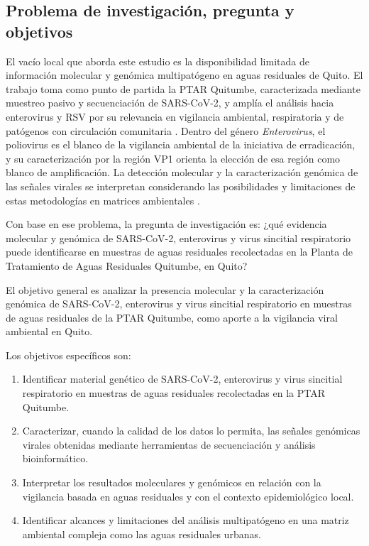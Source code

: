 \subsection{Problema de investigación, pregunta y objetivos}

El vacío local que aborda este estudio es la disponibilidad limitada de información molecular y genómica multipatógeno en aguas residuales de Quito. El trabajo toma como punto de partida la PTAR Quitumbe, caracterizada mediante muestreo pasivo y secuenciación de SARS-CoV-2, y amplía el análisis hacia enterovirus y RSV por su relevancia en vigilancia ambiental, respiratoria y de patógenos con circulación comunitaria \cite{MejiaCalle_2024,Hughes_2022,Le_2025}. Dentro del género \textit{Enterovirus}, el poliovirus es el blanco de la vigilancia ambiental de la iniciativa de erradicación, y su caracterización por la región VP1 orienta la elección de esa región como blanco de amplificación. La detección molecular y la caracterización genómica de las señales virales se interpretan considerando las posibilidades y limitaciones de estas metodologías en matrices ambientales \cite{Child_2023,Parkins_2023,Asghar_2014}.

Con base en ese problema, la pregunta de investigación es: ¿qué evidencia molecular y genómica de SARS-CoV-2, enterovirus y virus sincitial respiratorio puede identificarse en muestras de aguas residuales recolectadas en la Planta de Tratamiento de Aguas Residuales Quitumbe, en Quito?

El objetivo general es analizar la presencia molecular y la caracterización genómica de SARS-CoV-2, enterovirus y virus sincitial respiratorio en muestras de aguas residuales de la PTAR Quitumbe, como aporte a la vigilancia viral ambiental en Quito.

Los objetivos específicos son:
\begin{enumerate}[label=\arabic*.]
  \item Identificar material genético de SARS-CoV-2, enterovirus y virus sincitial respiratorio en muestras de aguas residuales recolectadas en la PTAR Quitumbe.
  \item Caracterizar, cuando la calidad de los datos lo permita, las señales genómicas virales obtenidas mediante herramientas de secuenciación y análisis bioinformático.
  \item Interpretar los resultados moleculares y genómicos en relación con la vigilancia basada en aguas residuales y con el contexto epidemiológico local.
  \item Identificar alcances y limitaciones del análisis multipatógeno en una matriz ambiental compleja como las aguas residuales urbanas.
\end{enumerate}
